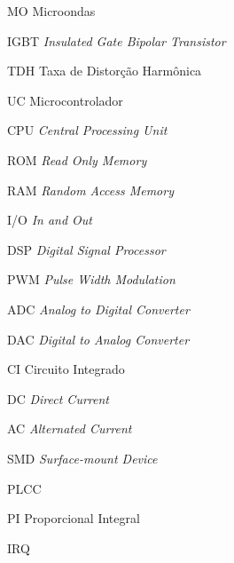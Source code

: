 
\begin{siglas}
    \item[MO] Microondas
    \item[IGBT] \textit{Insulated Gate Bipolar Transistor}
    \item[TDH] Taxa de Distorção Harmônica
    \item[UC] Microcontrolador
    \item[CPU] \textit{Central Processing Unit}
    \item[ROM] \textit{Read Only Memory}
    \item[RAM] \textit{Random Access Memory}
    \item[I/O] \textit{In and Out}
    \item[DSP] \textit{Digital Signal Processor}
    \item[PWM] \textit{Pulse Width Modulation}
    \item[ADC] \textit{Analog to Digital Converter}
    \item[DAC] \textit{Digital to Analog Converter}
    \item[CI] Circuito Integrado
    \item[DC] \textit{Direct Current}
    \item[AC] \textit{Alternated Current}
    \item[SMD] \textit{Surface-mount Device}
    \item[PLCC] 
    \item[PI] Proporcional Integral
    \item[IRQ] 
\end{siglas}

